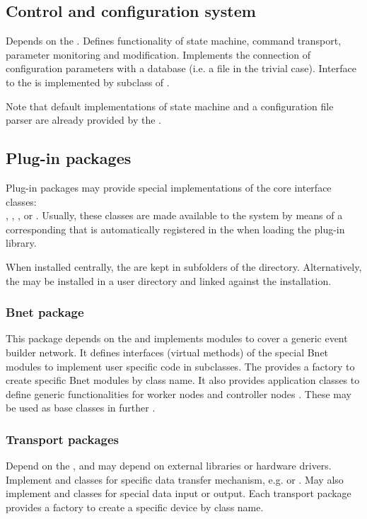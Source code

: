 \subsection{Control and configuration system}
   Depends on the . Defines 
   functionality of state machine, command transport, parameter 
   monitoring and modification. Implements the 
   connection of configuration parameters with a database 
   (i.e. a file in the trivial case). Interface to the  is 
   implemented by subclass of .
   
   Note that default implementations of state machine and a configuration file
   parser are already provided by the .

                
\subsection{Plug-in packages}
Plug-in packages may provide special implementations of the core interface classes: \\
, , , or
. Usually, these classes are made available to the system by means
of a corresponding  that is automatically registered in the  
when loading the plug-in library.

When installed centrally, the  are kept in subfolders of the   directory.
Alternatively, the  may be installed in a user directory and linked against the
 installation.

\subsubsection{Bnet package}
   This package depends on the  and implements 
   modules to cover a generic event builder network. 
   It defines interfaces (virtual methods) of the special Bnet modules to 
   implement user specific code in subclasses. The  provides a 
   factory to create specific Bnet modules by class name. It also 
   provides application classes to define generic functionalities for 
   worker nodes  and    controller nodes . These may be used as base classes
   in further .
   
\subsubsection{Transport packages}
   Depend on the , and may depend on external libraries or hardware drivers. 
   Implement  and 
    classes for specific data transfer mechanism, e.g. 
    or . May also implement  
   and  classes for special data input or output. Each transport package provides a 
   factory to create a specific device by class name. 
   
